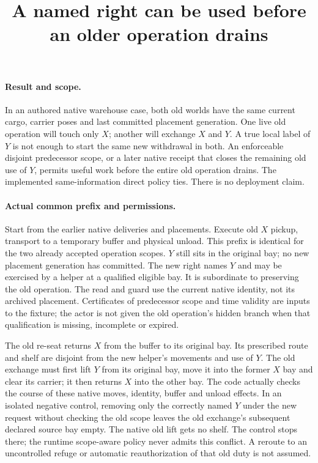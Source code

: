 \documentclass[11pt]{article}
\title{A named right can be used before an older operation drains}
\date{}
\begin{document}
\maketitle

\paragraph{Result and scope.}
In an authored native warehouse case, both old worlds have the same
current cargo, carrier poses and last committed placement generation.
One live old operation will touch only $X$; another will exchange $X$
and $Y$. A true local label of $Y$ is not enough to start the same new
withdrawal in both. An enforceable disjoint predecessor scope, or a later
native receipt that closes the remaining old use of $Y$, permits useful
work before the entire old operation drains. The implemented
same-information direct policy ties. There is no deployment claim.

\paragraph{Actual common prefix and permissions.}
Start from the earlier native deliveries and placements. Execute old
$X$ pickup, transport to a temporary buffer and physical unload.
This prefix is identical for the two already accepted operation
scopes. $Y$ still sits in the original bay; no new placement
generation has committed. The new right names $Y$ and may be
exercised by a helper at a qualified eligible bay. It is subordinate
to preserving the old operation. The read and guard use the
current native identity, not its archived placement. Certificates of
predecessor scope and time validity are inputs to the fixture;
the actor is not given the old operation's hidden branch when
that qualification is missing, incomplete or expired.

The old re-seat returns $X$ from the buffer to its original bay.
Its prescribed route and shelf are disjoint from the new helper's
movements and use of $Y$. The old exchange must first lift $Y$
from its original bay, move it into the former $X$ bay and clear
its carrier; it then returns $X$ into the other bay. The code
actually checks the course of these native moves, identity,
buffer and unload effects. In an isolated negative control,
removing only the correctly named $Y$ under the new request
without checking the old scope leaves the old exchange's
subsequent declared source bay empty. The native old lift gets
no shelf. The control stops there; the runtime scope-aware policy
never admits this conflict. A reroute to an uncontrolled refuge
or automatic reauthorization of that old duty is not assumed.
\end{document}

